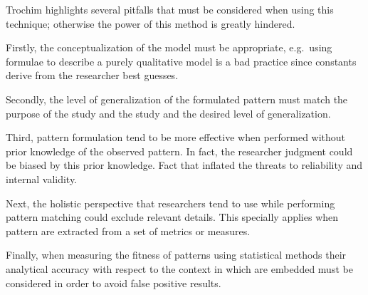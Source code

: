 Trochim \cite{pattern_matching} highlights several pitfalls that must be considered when using this technique; otherwise the power of this method is greatly hindered. 

Firstly, the conceptualization of the model must be appropriate, e.g.\ using formulae to describe a purely qualitative model is a bad practice since constants derive from the researcher best guesses.

Secondly, the level of generalization of the formulated pattern must match the purpose of the study and the study and the desired level of generalization.

Third, pattern formulation tend to be more effective when performed without prior knowledge of the observed pattern. In fact, the researcher judgment could be biased by this prior knowledge. Fact that inflated the threats to reliability and internal validity.

Next, the holistic perspective that researchers tend to use while performing pattern matching could exclude relevant details. This specially applies when pattern are extracted from a set of metrics or measures.

Finally, when measuring the fitness of patterns using statistical methods their analytical accuracy with respect to the context in which are embedded must be considered in order to avoid false positive results.


